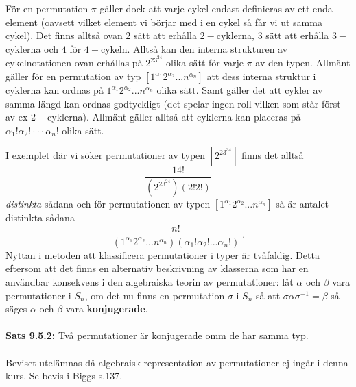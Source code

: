 \documentclass{article}
\begin{document}
För en permutation $\pi$ gäller dock att varje cykel endast definieras av ett enda element (oavsett vilket element vi börjar med i en cykel så får vi ut samma cykel). Det finns alltså ovan $2$ sätt att erhålla $2-$cyklerna, $3$ sätt att erhålla $3-$cyklerna och $4$ för $4-$cykeln. Alltså kan den interna strukturen av cykelnotationen ovan erhållas på $2^23^24$ olika sätt för varje $\pi$ av den typen. Allmänt gäller för en permutation av typ $[1^{\alpha_1}2^{\alpha_2}...n^{\alpha_n}]$ att dess interna struktur i cyklerna kan ordnas på $1^{\alpha_1}2^{\alpha_2}...n^{\alpha_n}$ olika sätt. Samt gäller det att cykler av samma längd kan ordnas godtyckligt (det spelar ingen roll vilken som står först av ex $2-$cyklerna). Allmänt gäller alltså att cyklerna kan placeras på $\alpha_1!\alpha_2!\cdot\cdot\cdot\alpha_n!$ olika sätt.

I exemplet där vi söker permutationer av typen $[2^23^34]$ finns det alltså
$$
\frac{14!}{(2^23^24)(2!2!)}
$$
\textit{distinkta} sådana och för permutationen av typen $[1^{\alpha_1}2^{\alpha_2}...n^{\alpha_n}]$ så är antalet distinkta sådana
\begin{equation}
    \frac{n!}{(1^{\alpha_1}2^{\alpha_2}...n^{\alpha_n})(\alpha_1!\alpha_2!...\alpha_n!)} \ .
\end{equation}
Nyttan i metoden att klassificera permutationer i typer är tvåfaldig. Detta eftersom att det finns en alternativ beskrivning av klasserna som har en användbar konsekvens i den algebraiska teorin av permutationer: låt $\alpha$ och $\beta$ vara permutationer i $S_n$, om det nu finns en permutation $\sigma$ i $S_n$ så att $\sigma\alpha\sigma^{-1}=\beta$ så säges $\alpha$ och $\beta$ vara \textbf{konjugerade}.
\\ \\
\textbf{Sats 9.5.2:} Två permutationer är konjugerade omm de har samma typ.
\\ \\
Beviset utelämnas då algebraisk representation av permutationer ej ingår i denna kurs. Se bevis i Biggs s.137.
\end{document}
